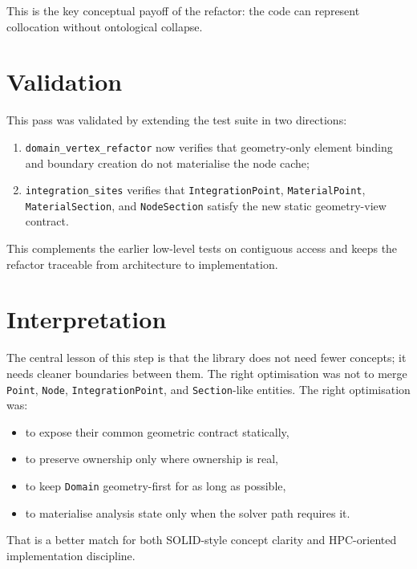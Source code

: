 This is the key conceptual payoff of the refactor: the code can represent
collocation without ontological collapse.

\section{Validation}

This pass was validated by extending the test suite in two directions:
\begin{enumerate}[nosep]
  \item \texttt{domain\_vertex\_refactor} now verifies that geometry-only
        element binding and boundary creation do not materialise the node cache;
  \item \texttt{integration\_sites} verifies that
        \texttt{IntegrationPoint}, \texttt{MaterialPoint},
        \texttt{MaterialSection}, and \texttt{NodeSection} satisfy the new
        static geometry-view contract.
\end{enumerate}

This complements the earlier low-level tests on contiguous access and keeps the
refactor traceable from architecture to implementation.

\section{Interpretation}

The central lesson of this step is that the library does not need fewer
concepts; it needs cleaner boundaries between them.  The right optimisation was
not to merge \texttt{Point}, \texttt{Node}, \texttt{IntegrationPoint}, and
\texttt{Section}-like entities.  The right optimisation was:
\begin{itemize}[nosep]
  \item to expose their common geometric contract statically,
  \item to preserve ownership only where ownership is real,
  \item to keep \texttt{Domain} geometry-first for as long as possible,
  \item to materialise analysis state only when the solver path requires it.
\end{itemize}

That is a better match for both SOLID-style concept clarity and HPC-oriented
implementation discipline.
